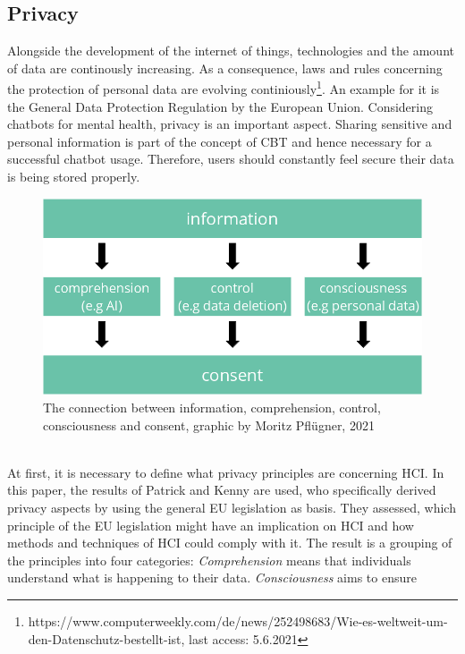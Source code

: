 \documentclass[sigconf, nonacm]{acmart}
\begin{document}
\subsection{Privacy}
\label{sec:three_one}
Alongside the development of the internet of things, technologies and the amount of data are continously increasing\cite{Reinsel2018}.
As a consequence, laws and rules concerning the protection of personal data are evolving continiously\footnote{https://www.computerweekly.com/de/news/252498683/Wie-es-weltweit-um-den-Datenschutz-bestellt-ist, last access: 5.6.2021}.
An example for it is the General Data Protection Regulation by the European Union. Considering chatbots for mental health, privacy is an important aspect. Sharing sensitive and personal information is part of the concept of CBT and hence necessary for a successful chatbot usage. Therefore, users should constantly feel secure their data is being stored properly. 
\begin{figure}[h]
  \centering
  \includegraphics[width=\linewidth]{privacy_base}
  \caption{The connection between information, comprehension, control, consciousness and consent, graphic by Moritz Pflügner, 2021}
  \label{fig:privacy_base}
\end{figure}
\\
At first, it is necessary to define what privacy principles are concerning HCI. In this paper, the results of Patrick and Kenny \cite{Patrick2003} are used, who specifically derived privacy aspects by using the general EU legislation as basis.
They assessed, which principle of the EU legislation might have an implication on HCI and how methods and techniques of HCI could comply with it. The result is a grouping of the principles into four categories: \emph{Comprehension} means that individuals understand what is happening to their data. \emph{Consciousness} aims to ensure
\end{document}
